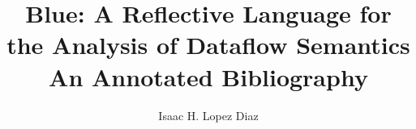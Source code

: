\documentclass{article}
\title{Blue: A Reflective Language for the Analysis of Dataflow Semantics \\ An Annotated Bibliography}
\author{Isaac H. Lopez Diaz}
\begin{document}
\maketitle



\nocite{*}
\end{document}

